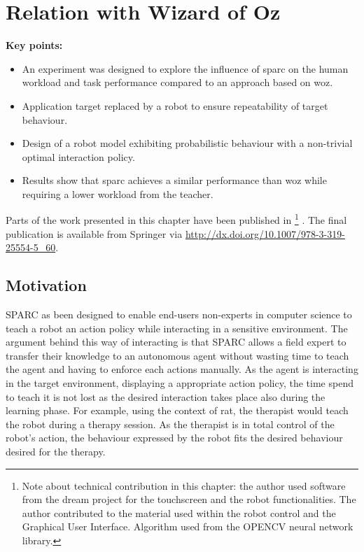 \chapter{Relation with Wizard of Oz}\label{chap:woz}

\graphicspath{{images/woz/}}

\begin{framed}
	\textbf{Key points:}
	
	\begin{itemize}
		\item An experiment was designed to explore the influence of \gls{sparc} on the human workload and task performance compared to an approach based on \gls{woz}.
		\item Application target replaced by a robot to ensure repeatability of target behaviour.
		\item Design of a robot model exhibiting probabilistic behaviour with a non-trivial optimal interaction policy.
		\item Results show that \gls{sparc} achieves a similar performance than \gls{woz} while requiring a lower workload from the teacher.
	\end{itemize}
\end{framed}

Parts of the work presented in this chapter have been published in \cite{senft2015sparc} \footnote{Note about technical contribution in this chapter: the author used software from the \gls{dream} project for the touchscreen and the robot functionalities. The author contributed to the material used within the robot control and the Graphical User Interface. Algorithm used from the OPENCV neural network library.} . The final publication is available from Springer via \url{http://dx.doi.org/10.1007/978-3-319-25554-5_60}.

\newpage

\section{Motivation}

SPARC as been designed to enable end-users non-experts in computer science to teach a robot an action policy while interacting in a sensitive environment. The argument behind this way of interacting is that SPARC allows a field expert to transfer their knowledge to an autonomous agent without wasting time to teach the agent and having to enforce each actions manually. As the agent is interacting in the target environment, displaying a appropriate action policy, the time spend to teach it is not lost as the desired interaction takes place also during the learning phase. For example, using the context of \gls{rat}, the therapist would teach the robot during a therapy session. As the therapist is in total control of the robot's action, the behaviour expressed by the robot fits the desired behaviour desired for the therapy.

